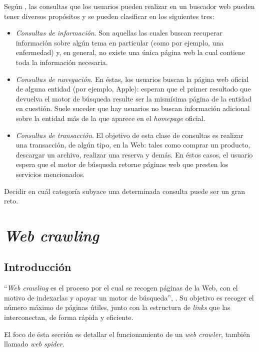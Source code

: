 	Según \cite{manning2009}, las consultas que los usuarios pueden realizar en un buscador web pueden tener diversos propósitos y se pueden clasificar en los siguientes tres:
	\begin{itemize}
		\item \textit{Consultas de información}. Son aquellas las cuales buscan recuperar información sobre algún tema en particular (como por ejemplo, una enfermedad) y, en general, no existe una única página web la cual contiene toda la información necesaria.
		\item \textit{Consultas de navegación}. En éstas, los usuarios buscan la página web oficial de alguna entidad (por ejemplo, Apple): esperan que el primer resultado que devuelva el motor de búsqueda resulte ser la mismísima página de la entidad en cuestión. Suele suceder que hay usuarios no buscan información adicional sobre la entidad más de la que aparece en el \textit{homepage} oficial.
		\item \textit{Consultas de transacción}. El objetivo de esta clase de consultas es realizar una transacción, de algún tipo, en la Web: tales como comprar un producto, descargar un archivo, realizar una reserva y demás. En éstos casos, el usuario espera que el motor de búsqueda retorne páginas web que presten los servicios mencionados.
	\end{itemize}
	
	Decidir en cuál categoría subyace una determinada consulta puede ser un gran reto.
	
\section{\textit{Web crawling}}
	\subsection{Introducción}
		\enquote{\textit{Web crawling} es el proceso por el cual se recogen páginas de la Web, con el motivo de indexarlas y apoyar un motor de búsqueda}, \cite{manning2009}. Su objetivo es recoger el número máximo de páginas útiles, junto con la estructura de \textit{links} que las interconectan, de forma rápida y eficiente. \par
		
		El foco de ésta sección es detallar el funcionamiento de un \textit{web crawler}, también llamado \textit{web spider}.
		
		
